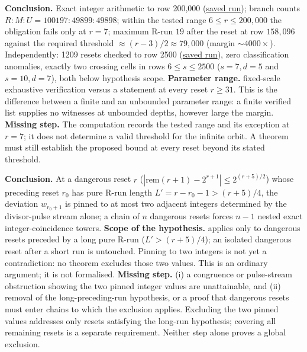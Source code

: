 \begin{obs}
\textbf{Conclusion.} Exact integer arithmetic to row 200{,}000
(\href{https://github.com/wcook04/plectis-erdos/blob/f757115e03bebe5c04431a147da559015c680a37/research/experiments/erdos257/receipts/seam-orbit-200000.json}{saved run}); branch counts $R\!:\!M\!:\!U =
100197\!:\!49899\!:\!49898$; within the tested range $6\le r\le200{,}000$ the obligation fails only at $r=7$; maximum R-run $19$ after the reset at row
$158{,}096$ against the required threshold $\approx (r-3)/2 \approx 79{,}000$ (margin
$\sim\!4000\times$). Independently: 1209 resets checked to row 2500
(\href{https://github.com/wcook04/plectis-erdos/blob/f757115e03bebe5c04431a147da559015c680a37/research/experiments/erdos257/receipts/seam-reset-crossing-2500.json}{saved run}), zero classification
anomalies, exactly two crossing cells in rows $6\le s\le2500$ ($s{=}7,d{=}5$ and $s{=}10,d{=}7$), both below hypothesis
scope.
\textbf{Parameter range.} fixed-scale exhaustive verification versus a statement
at every reset $r \ge 31$.  This is the difference between a finite and an unbounded
parameter range: a finite verified list supplies no witnesses at unbounded depths, however
large the margin.
\textbf{Missing step.} The computation records the tested range and its
exception at $r=7$; it does not determine a valid threshold for the infinite
orbit. A theorem must still establish the proposed bound at every reset
beyond its stated threshold.
\end{obs}

\begin{obs}
\textbf{Conclusion.} At a dangerous reset $r$ ($|\mathrm{rem}(r{+}1)-2^{r+1}| \le 2^{(r+5)/2}$) whose
preceding reset $r_0$ has pure R-run length $L' = r-r_0-1 > (r+5)/4$, the deviation
$w_{r_0+1}$ is pinned to at most two adjacent integers determined by the divisor-pulse stream
alone; a chain of $n$ dangerous resets forces $n{-}1$ nested exact integer-coincidence towers.
\textbf{Scope of the hypothesis.} applies only to dangerous resets preceded by a
long pure R-run ($L' > (r+5)/4$); an isolated dangerous reset after a short run is untouched.
Pinning to two integers is not yet a contradiction: no theorem excludes those two values.  This is
an ordinary argument; it is not formalised.
\textbf{Missing step.} (i) a congruence or pulse-stream obstruction showing the two pinned integer
values are unattainable, and (ii) removal of the long-preceding-run hypothesis, or a proof that
dangerous resets must enter chains to which the exclusion applies.
Excluding the two pinned values addresses only resets satisfying the
long-run hypothesis; covering all remaining resets is a separate
requirement.  Neither step alone proves a global exclusion.
\end{obs}

